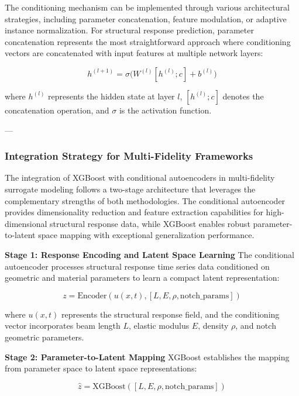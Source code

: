 \documentclass[12pt,a4paper]{report}
\begin{document}
The conditioning mechanism can be implemented through various architectural strategies, including parameter concatenation, feature modulation, or adaptive instance normalization. For structural response prediction, parameter concatenation represents the most straightforward approach where conditioning vectors are concatenated with input features at multiple network layers:

\begin{equation}
h^{(l+1)} = \sigma \Big( W^{(l)} [h^{(l)}; c] + b^{(l)} \Big)
\end{equation}

where $h^{(l)}$ represents the hidden state at layer $l$, $[h^{(l)}; c]$ denotes the concatenation operation, and $\sigma$ is the activation function.

---

\subsubsection*{Integration Strategy for Multi-Fidelity Frameworks}

The integration of XGBoost with conditional autoencoders in multi-fidelity surrogate modeling follows a two-stage architecture that leverages the complementary strengths of both methodologies. The conditional autoencoder provides dimensionality reduction and feature extraction capabilities for high-dimensional structural response data, while XGBoost enables robust parameter-to-latent space mapping with exceptional generalization performance.

\textbf{Stage 1: Response Encoding and Latent Space Learning}  
The conditional autoencoder processes structural response time series data conditioned on geometric and material parameters to learn a compact latent representation:

\begin{equation}
z = \text{Encoder}(u(x,t), [L, E, \rho, \text{notch\_params}])
\end{equation}

where $u(x,t)$ represents the structural response field, and the conditioning vector incorporates beam length $L$, elastic modulus $E$, density $\rho$, and notch geometric parameters.

\textbf{Stage 2: Parameter-to-Latent Mapping}  
XGBoost establishes the mapping from parameter space to latent space representations:

\begin{equation}
\hat{z} = \text{XGBoost}([L, E, \rho, \text{notch\_params}])
\end{equation}
\end{document}
